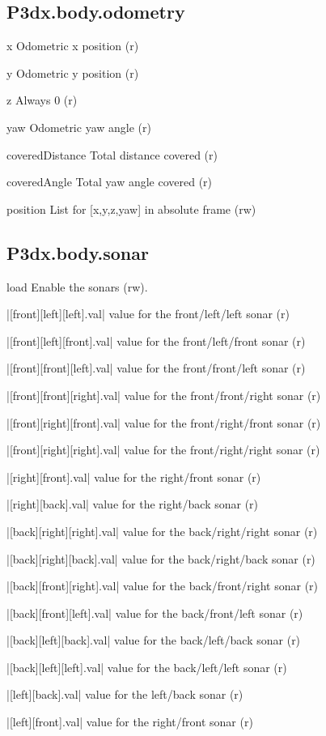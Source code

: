 \subsection{P3dx.body.odometry}
\begin{urbiscriptapi}
\item[x] Odometric x position (r)
\item[y] Odometric y position (r)
\item[z] Always 0 (r)
\item[yaw] Odometric yaw angle (r)
\item[coveredDistance] Total distance covered (r)
\item[coveredAngle] Total yaw angle covered (r)
\item[position] List for [x,y,z,yaw] in absolute frame (rw)
\end{urbiscriptapi}



\subsection{P3dx.body.sonar}

\begin{urbiscriptapi}
\item[load] Enable the sonars (rw).
\item|[front][left][left].val| value for the front/left/left sonar (r)
\item|[front][left][front].val| value for the front/left/front sonar (r)
\item|[front][front][left].val| value for the front/front/left sonar (r)
\item|[front][front][right].val| value for the front/front/right sonar (r)
\item|[front][right][front].val| value for the front/right/front sonar (r)
\item|[front][right][right].val| value for the front/right/right sonar (r)
\item|[right][front].val| value for the right/front sonar (r)
\item|[right][back].val| value for the right/back sonar (r)
\item|[back][right][right].val| value for the back/right/right sonar (r)
\item|[back][right][back].val| value for the back/right/back sonar (r)
\item|[back][front][right].val| value for the back/front/right sonar (r)
\item|[back][front][left].val| value for the back/front/left sonar (r)
\item|[back][left][back].val| value for the back/left/back sonar (r)
\item|[back][left][left].val| value for the back/left/left sonar (r)
\item|[left][back].val| value for the left/back sonar (r)
\item|[left][front].val| value for the right/front sonar (r)
\end{urbiscriptapi}

